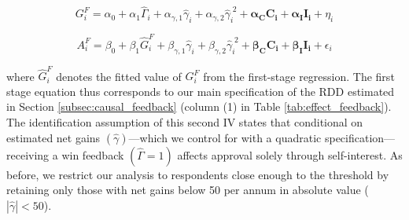 \documentclass[12pt]{article} %
\begin{document}

\begin{equation}
    G_i^F = \alpha_0 + \alpha_1 \widehat{\Gamma}_{i} + \alpha_{\gamma,1} \widehat{\gamma}_{i} + \alpha_{\gamma,2} \widehat{\gamma}_{i}^{\;2} + \mathbf{\alpha_C C_i} + \mathbf{\alpha_I I_i} + \eta_i
    \label{eq:first_stage_parametric_rdd_approve_winner_feedback}
\end{equation}

\vspace{-.0cm}

\begin{equation}
    A_i^F = \beta_0 + \beta_1 \widehat{G}_i^F + \beta_{\gamma,1} \widehat{\gamma}_{i} + \beta_{\gamma,2} \widehat{\gamma}_{i}^{\;2} + \mathbf{\beta_C C_i} + \mathbf{\beta_I I_i} + \epsilon_i
    \label{eq:second_stage_feed_with_rdd_approve_winner}
\end{equation}

\vspace{.5cm}


\noindent
where $\widehat{G}_i^F$ denotes the fitted value of $G_i^F$ from the first-stage regression. The first stage equation thus corresponds to our main specification of the RDD estimated in Section \ref{subsec:causal_feedback} (column (1) in Table \ref{tab:effect_feedback}). The identification assumption of this second IV states that conditional on estimated net gains $(\widehat{\gamma})$---which we control for with a quadratic specification---receiving a win feedback $(\widehat{\Gamma} = 1)$ affects approval solely through self-interest. As before, we restrict our analysis to respondents close enough to the threshold by retaining only those with net gains below 50\euros{} per annum in absolute value ($\left| \widehat{\gamma}\right|<50$).
\end{document}
